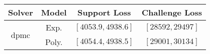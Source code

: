 \begin{tabular}{cc|c|c} 
\hline 
 Solver & Model & Support Loss  & Challenge Loss \tabularnewline\hline 
\hline 
\multirow{2}{*}{dpmc} & Exp. & $\left[4053.9,4938.6\right]$ & $\left[28592,29497\right]$ \tabularnewline 
 & Poly. & $\left[4054.4,4938.5\right]$ & $\left[29001,30134\right]$ \tabularnewline 
\hline 
\end{tabular} 

